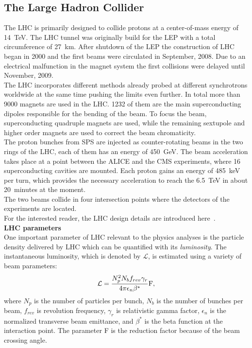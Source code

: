 \subsection{The Large Hadron Collider}
\label{lhc_params}
The LHC is primarily designed to collide protons at a center-of-mass energy of 14~TeV. The LHC tunnel was originally build for the LEP with a total circumference of 27~km.
After shutdown of the LEP the construction of LHC began in 2000 and the first beams were circulated in September, 2008. Due to an electrical malfunction in the magnet system the first collisions were delayed until November, 2009. \\
The LHC incorporates different methods already probed at different synchrotrons worldwide at the same time pushing the limits even further. 
In total more than 9000 magnets are used in the LHC. 1232 of them are the main superconducting dipoles responsible for the bending of the beam. To focus the beam, superconducting quadruple magnets are  used, while the remaining sextupole and higher order magnets are used to correct the beam chromaticity. \\
The proton bunches from SPS are injected as counter-rotating beams in the two rings of the LHC, each of them has an energy of 450~GeV. The beam acceleration takes place at a point between the ALICE and the CMS experiments, where 16 superconducting cavities are mounted. Each proton gains an energy of 485~keV per turn, which provides the necessary acceleration to reach the 6.5~TeV in about 20~minutes at the moment. \\
The two beams collide in four intersection points where the detectors of the experiments are located.\\
For the interested reader, the LHC design details are introduced here~\cite{LHCDR}. \\
\textbf{LHC parameters}\\
One important parameter of LHC relevant to the physics analyses is the particle density delivered by LHC which can be quantified with its {\it luminosity}. The instantaneous luminosity, which is denoted by $\mathcal{L}$, is estimated using a variety of beam parameters:
\begin{equation}
  \label{eqn:Lum_inst}
  \mathcal{L} = \frac{N^2_pN_bf_{rev}\gamma_r}{4\pi\epsilon_n\beta^*}\rm F,
\end{equation}
where $N_p$ is the number of particles per bunch, $N_b$ is the number of bunches per beam, $f_{rev}$ is revolution frequency, $\gamma_r$ is relativistic gamma factor, $\epsilon_n$ is the normalized transverse beam emittance, and $\beta^*$ is the beta function at the interaction point. The parameter F is the reduction factor because of the beam crossing angle.\\

